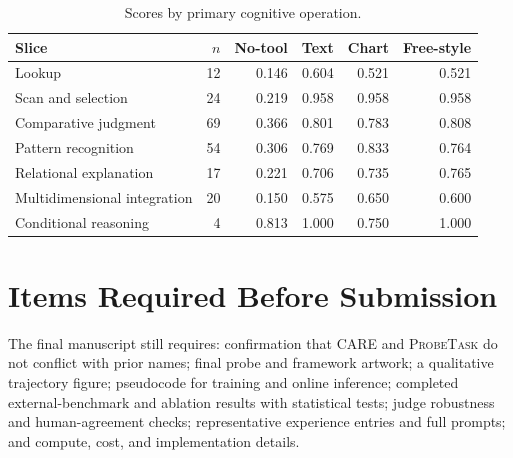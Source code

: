 \documentclass{article}
\newcommand{\method}{\textsc{CARE}}
\newcommand{\probe}{\textsc{ProbeTask}}
\begin{document}
\begin{table}[h]
  \caption{Scores by primary cognitive operation.}
  \label{tab:cognitive-slices}
  \centering
  \scriptsize
  \setlength{\tabcolsep}{3.5pt}
  \begin{tabular}{lrrrrr}
    \toprule
    Slice & $n$ & No-tool & Text & Chart & Free-style \\
    \midrule
    Lookup                    & 12 & 0.146 & 0.604 & 0.521 & 0.521 \\
    Scan and selection        & 24 & 0.219 & 0.958 & 0.958 & 0.958 \\
    Comparative judgment      & 69 & 0.366 & 0.801 & 0.783 & 0.808 \\
    Pattern recognition       & 54 & 0.306 & 0.769 & 0.833 & 0.764 \\
    Relational explanation    & 17 & 0.221 & 0.706 & 0.735 & 0.765 \\
    Multidimensional integration & 20 & 0.150 & 0.575 & 0.650 & 0.600 \\
    Conditional reasoning     &  4 & 0.813 & 1.000 & 0.750 & 1.000 \\
    \bottomrule
  \end{tabular}
\end{table}

\section{Items Required Before Submission}
\label{app:pending}

The final manuscript still requires: confirmation that \method{} and \probe{} do not conflict with prior names; final probe and framework artwork; a qualitative trajectory figure; pseudocode for training and online inference; completed external-benchmark and ablation results with statistical tests; judge robustness and human-agreement checks; representative experience entries and full prompts; and compute, cost, and implementation details.
\end{document}
